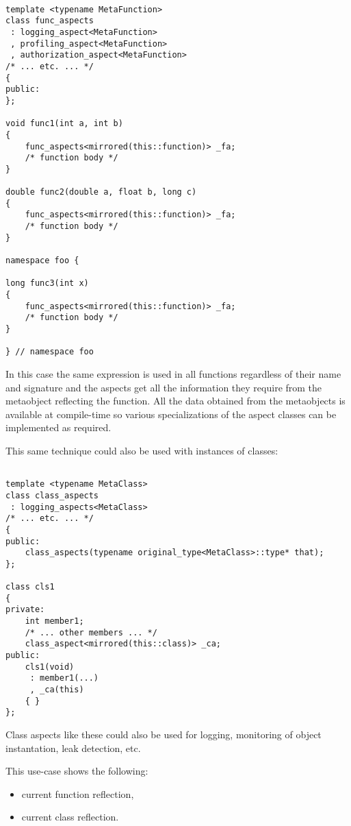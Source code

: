 \begin{verbatim}

template <typename MetaFunction>
class func_aspects
 : logging_aspect<MetaFunction>
 , profiling_aspect<MetaFunction>
 , authorization_aspect<MetaFunction>
/* ... etc. ... */
{
public:
};

void func1(int a, int b)
{
	func_aspects<mirrored(this::function)> _fa;
	/* function body */
}

double func2(double a, float b, long c)
{
	func_aspects<mirrored(this::function)> _fa;
	/* function body */
}

namespace foo {

long func3(int x)
{
	func_aspects<mirrored(this::function)> _fa;
	/* function body */
}

} // namespace foo

\end{verbatim}

In this case the same expression is used in all functions
regardless of their name and signature and the aspects get all the information
they require from the metaobject reflecting the function. All the data
obtained from the metaobjects is available at compile-time so various
specializations of the aspect classes can be implemented as required.

This same technique could also be used with instances of classes:

\begin{verbatim}

template <typename MetaClass>
class class_aspects
 : logging_aspects<MetaClass>
/* ... etc. ... */
{
public:
	class_aspects(typename original_type<MetaClass>::type* that);
};

class cls1
{
private:
	int member1;
	/* ... other members ... */
	class_aspect<mirrored(this::class)> _ca;
public:
	cls1(void)
	 : member1(...)
	 , _ca(this)
	{ }
};

\end{verbatim}

Class aspects like these could also be used for logging, monitoring of object instantation,
leak detection, etc.

This use-case shows the following:

\begin{itemize}
\item{current function reflection,}
\item{current class reflection.}
\end{itemize}

